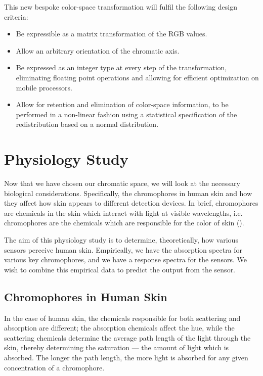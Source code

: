 This new bespoke color-space transformation will fulfil the following design criteria:

\begin{itemize}
\item Be expressible as a matrix transformation of the RGB values.
\item Allow an arbitrary orientation of the chromatic axis.
\item Be expressed as an integer type at every step of the transformation, eliminating floating point operations and allowing for efficient optimization on mobile processors.
\item Allow for retention and elimination of color-space information, to be performed in a non-linear fashion using a statistical specification of the redistribution based on a normal distribution.
\end{itemize}


\section{Physiology Study}\label{sec:PhysiologyStudy}

Now that we have chosen our chromatic space, we will look at the necessary biological considerations. Specifically, the chromophores in human skin and how they affect how skin appears to different detection devices. In brief, chromophores are chemicals in the skin which interact with light at visible wavelengths, i.e. chromophores are the chemicals which are responsible for the color of skin (\cite{Anderson1981}).

The aim of this physiology study is to determine, theoretically, how various sensors perceive human skin. Empirically, we have the absorption spectra for various key chromophores, and we have a response spectra for the sensors. We wish to combine this empirical data to predict the output from the sensor. 

\subsection{Chromophores in Human Skin}

In the case of human skin, the chemicals responsible for both scattering and absorption are different; the absorption chemicals affect the hue, while the scattering chemicals determine the average path length of the light through the skin, thereby determining the saturation --- the amount of light which is absorbed. The longer the path length, the more light is absorbed for any given concentration of a chromophore. 

